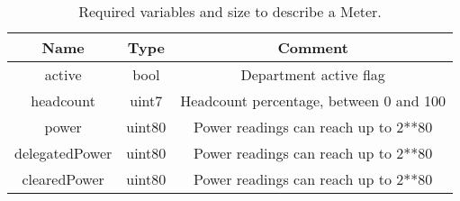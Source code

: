 \begin{table}[H]
	\centering
	\vspace*{-1ex}
	\scriptsize
	\vspace{-1ex}
	\caption{Required variables and size to describe a Meter.}
	\begin{tabular}{|c|c|c|}
        \hline
        \textbf{Name} & \textbf{Type}  & \textbf{Comment}\\ \hline 
        active         & bool         & Department active flag\\
        headcount      & uint7        & Headcount percentage, between 0 and 100\\
        power          & uint80       & Power readings can reach up to 2**80\\
        delegatedPower & uint80       & Power readings can reach up to 2**80\\
        clearedPower   & uint80       & Power readings can reach up to 2**80\\
        \hline
    \end{tabular}
    \label{table:department}
\end{table}